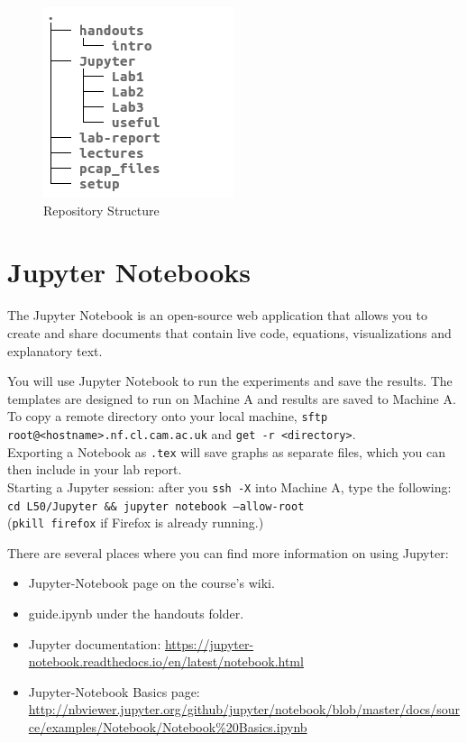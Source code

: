 \documentclass[]{scrartcl}
\begin{document}
\begin{figure}[h]
	\centering
	\includegraphics[width=0.3\linewidth]{"L50_filestructure"}
	\caption{Repository Structure}
	\label{fig:filestructure}
\end{figure}


\section{Jupyter Notebooks}
The Jupyter Notebook is an open-source web application that allows you to create and share documents that contain live code, equations, visualizations and explanatory text.

You will use Jupyter Notebook to run the experiments and save the results. The templates are designed to run on Machine A and results are saved to Machine A.\\
\noindent To copy a remote directory onto your local machine, \texttt{sftp root@<hostname>.nf.cl.cam.ac.uk} and \texttt{get -r <directory>}.\\
\noindent Exporting a Notebook as \texttt{.tex} will save graphs as separate files, which you can then include in your lab report.\\
				
\noindent Starting a Jupyter session: after you \texttt{ssh -X} into Machine A, type the following:
\\\texttt{cd L50/Jupyter {\&\&} jupyter notebook --allow-root}\\
(\texttt{pkill firefox} if Firefox is already running.) 

There are several places where you can find more information on using Jupyter:
\begin{itemize}
	\item Jupyter-Notebook page on the course's wiki.
	\item guide.ipynb under the handouts folder.
	\item Jupyter documentation: \url{https://jupyter-notebook.readthedocs.io/en/latest/notebook.html} 
	\item Jupyter-Notebook Basics page: \url{http://nbviewer.jupyter.org/github/jupyter/notebook/blob/master/docs/source/examples/Notebook/Notebook%20Basics.ipynb}
\end{itemize}
\end{document}
